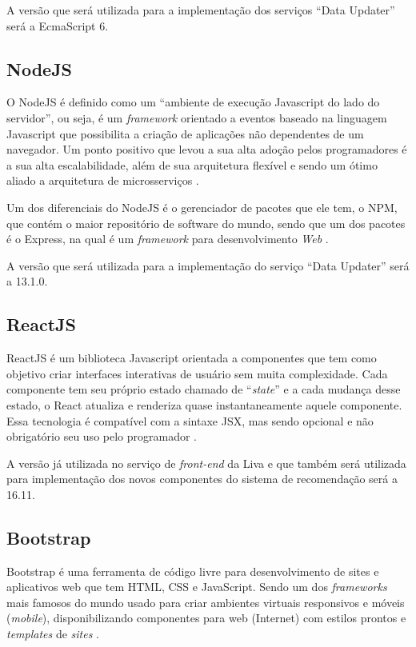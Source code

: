 A versão que será utilizada para a implementação dos serviços “Data Updater” será a EcmaScript 6.

\subsection{NodeJS}

O NodeJS é definido como um “ambiente de execução Javascript do lado do servidor”, ou seja, é um \textit{framework} orientado a eventos baseado na linguagem Javascript que possibilita a criação de aplicações não dependentes de um navegador. Um ponto positivo que levou a sua alta adoção pelos programadores é a sua alta escalabilidade, além de sua arquitetura flexível e sendo um ótimo aliado a arquitetura de microsserviços \cite{nodejs:2019}.

Um dos diferenciais do NodeJS é o gerenciador de pacotes que ele tem, o NPM, que contém o maior repositório de software do mundo, sendo que um dos pacotes é o Express, na qual é um \textit{framework} para desenvolvimento \textit{Web} \cite{lenon:2018}.

A versão que será utilizada para a implementação do serviço “Data Updater” será a 13.1.0.

\subsection{ReactJS}

ReactJS é um biblioteca Javascript orientada a componentes que tem como objetivo criar interfaces interativas de usuário sem muita complexidade. Cada componente tem seu próprio estado chamado de “\textit{state}” e a cada mudança desse estado, o React atualiza e renderiza quase instantaneamente aquele componente. Essa tecnologia é compatível com a sintaxe JSX, mas sendo opcional e não obrigatório seu uso pelo programador \cite{reactjs:2019}.

A versão já utilizada no serviço de \textit{front-end} da Liva e que também será utilizada para implementação dos novos componentes do sistema de recomendação será a 16.11.

\subsection{Bootstrap}

Bootstrap é uma ferramenta de código livre para desenvolvimento de sites e aplicativos web que tem HTML, CSS e JavaScript. Sendo um dos \textit{frameworks} mais famosos do mundo usado para criar ambientes virtuais responsivos e móveis (\textit{mobile}), disponibilizando componentes para web (Internet) com estilos prontos e \textit{templates} de \textit{sites} \cite{bootstrap:2019}.

